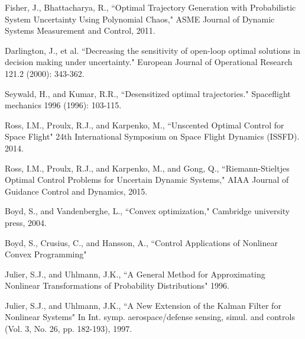 \documentclass[10pt,a4paper]{article}
\begin{document}
	
	\begin{thebibliography}{1}
		
		
		 Fisher, J., Bhattacharya, R., ``Optimal Trajectory Generation with Probabilistic System Uncertainty Using Polynomial Chaos," ASME Journal of Dynamic Systems Measurement and Control, 2011.
		
		Darlington, J., et al. ``Decreasing the sensitivity of open-loop optimal solutions in decision making under uncertainty." European Journal of Operational Research 121.2 (2000): 343-362.
		
		Seywald, H., and Kumar, R.R., ``Desensitized optimal trajectories." Spaceflight mechanics 1996 (1996): 103-115.
		
		Ross, I.M., Proulx, R.J., and Karpenko, M., ``Unscented Optimal Control for Space Flight" 24th International Symposium on Space Flight Dynamics (ISSFD). 2014.
		
		Ross, I.M., Proulx, R.J., and Karpenko, M., and Gong, Q., ``Riemann-Stieltjes Optimal Control Problems for Uncertain Dynamic Systems," AIAA Journal of Guidance Control and Dynamics, 2015.
		
		Boyd, S., and Vandenberghe, L., ``Convex optimization," Cambridge university press, 2004.
		
		Boyd, S., Crusius, C., and Hansson, A., ``Control Applications of Nonlinear Convex Programming"
		
		Julier, S.J., and Uhlmann, J.K., ``A General Method for Approximating Nonlinear Transformations of Probability Distributions" 1996.

		Julier, S.J., and Uhlmann, J.K., ``A New Extension of the Kalman Filter for Nonlinear Systems" In Int. symp. aerospace/defense sensing, simul. and controls (Vol. 3, No. 26, pp. 182-193), 1997.
		

\end{thebibliography}
\end{document}
